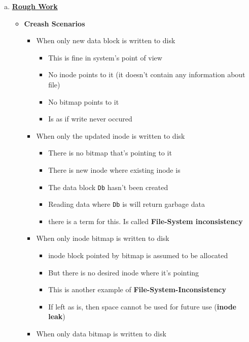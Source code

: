 \documentclass[12pt]{article}
\begin{document}
\begin{enumerate}[1.]
\begin{enumerate}[a)]
        \item

        \bigskip

        \underline{\textbf{Rough Work}}

        \begin{itemize}
            \item \textbf{Creash Scenarios}

            \begin{itemize}
                \item When only new data block is written to disk

                \begin{itemize}
                    \item This is fine in system's point of view
                    \item No inode points to it (it doesn't contain any information about file)
                    \item No bitmap points to it
                    \item Is as if write never occured
                \end{itemize}
                \item When only the updated inode is written to disk
                \begin{itemize}
                    \item There is no bitmap that's pointing to it
                    \item There is new inode where existing inode is
                    \item The data block \texttt{Db} hasn't been created
                    \item Reading data where \texttt{Db} is will return garbage data
                    \item there is a term for this. Is called \textbf{File-System inconsistency}
                \end{itemize}
                \item When only inode bitmap is written to disk

                \begin{itemize}
                    \item inode block pointed by bitmap is assumed to be allocated
                    \item But there is no desired inode where it's pointing
                    \item This is another example of \textbf{File-System-Inconsistency}
                    \item If left as is, then space cannot be used for future use (\textbf{inode leak})
                \end{itemize}
                \item When only data bitmap is written to disk


\end{itemize}
\end{itemize}
\end{enumerate}
\end{enumerate}
\end{document}
